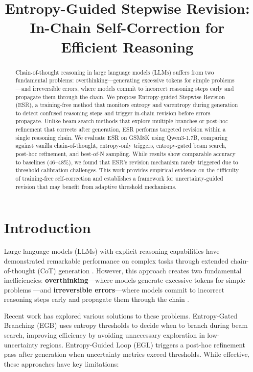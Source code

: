 \documentclass{article}
\title{Entropy-Guided Stepwise Revision: In-Chain Self-Correction for Efficient Reasoning}
\author{}
\begin{document}
\maketitle

\begin{abstract}
Chain-of-thought reasoning in large language models (LLMs) suffers from two fundamental problems: overthinking---generating excessive tokens for simple problems---and irreversible errors, where models commit to incorrect reasoning steps early and propagate them through the chain. We propose Entropy-guided Stepwise Revision (ESR), a training-free method that monitors entropy and varentropy during generation to detect confused reasoning steps and trigger in-chain revision before errors propagate. Unlike beam search methods that explore multiple branches or post-hoc refinement that corrects after generation, ESR performs targeted revision within a single reasoning chain. We evaluate ESR on GSM8K using Qwen3-1.7B, comparing against vanilla chain-of-thought, entropy-only triggers, entropy-gated beam search, post-hoc refinement, and best-of-N sampling. While results show comparable accuracy to baselines (46--48\%), we found that ESR's revision mechanism rarely triggered due to threshold calibration challenges. This work provides empirical evidence on the difficulty of training-free self-correction and establishes a framework for uncertainty-guided revision that may benefit from adaptive threshold mechanisms.
\end{abstract}

\section{Introduction}

Large language models (LLMs) with explicit reasoning capabilities have demonstrated remarkable performance on complex tasks through extended chain-of-thought (CoT) generation \citep{wei2022chain}. However, this approach creates two fundamental inefficiencies: \textbf{overthinking}---where models generate excessive tokens for simple problems \citep{kumar2025overthink}---and \textbf{irreversible errors}---where models commit to incorrect reasoning steps early and propagate them through the chain \citep{chiang2024overreasoning}.

Recent work has explored various solutions to these problems. Entropy-Gated Branching (EGB) \citep{li2025entropy} uses entropy thresholds to decide when to branch during beam search, improving efficiency by avoiding unnecessary exploration in low-uncertainty regions. Entropy-Guided Loop (EGL) \citep{correa2025entropy} triggers a post-hoc refinement pass after generation when uncertainty metrics exceed thresholds. While effective, these approaches have key limitations:
\end{document}
